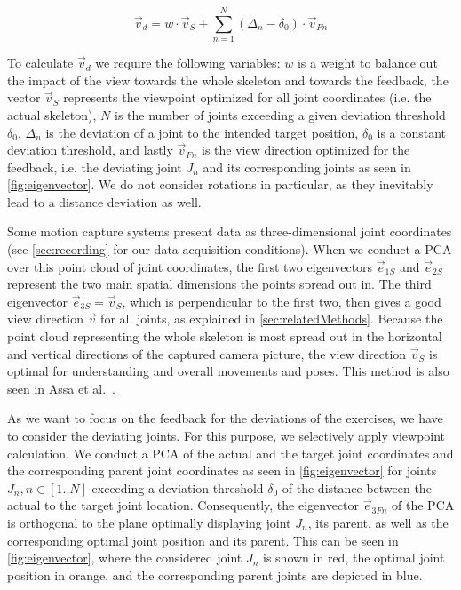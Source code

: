 \begin{equation}
	\label{eq:viewpoint}
	\vec{v}_d = w \cdot \vec{v}_{S} + \sum_{n=1}^N (\Delta_n - \delta_0) \cdot \vec{v}_{Fn}
\end{equation}

To calculate $\vec{v}_d$ we require the following variables: \(w\) is a weight to balance out the impact of the view towards the whole skeleton and towards the feedback, the vector \(\vec{v}_S\) represents the viewpoint optimized for all joint coordinates (i.e. the actual skeleton), \(N\) is the number of joints exceeding a given deviation threshold \(\delta_0\), \(\Delta_n\) is the deviation of a joint to the intended target position, \(\delta_0\) is a constant deviation threshold, and lastly \(\vec{v}_{Fn}\) is the view direction optimized for the feedback, i.e. the deviating joint \(J_n\) and its corresponding joints as seen in \autoref{fig:eigenvector}. We do not consider rotations in particular, as they inevitably lead to a distance deviation as well.

Some motion capture systems present data as three-dimensional joint coordinates (see \autoref{sec:recording} for our data acquisition conditions). When we conduct a PCA over this point cloud of joint coordinates, the first two eigenvectors \(\vec{e}_{1S}\) and \(\vec{e}_{2S}\) represent the two main spatial dimensions the points spread out in. The third eigenvector \(\vec{e}_{3S} = \vec{v}_S\), which is perpendicular to the first two, then gives a good view direction $\vec{v}$ for all joints, as explained in \autoref{sec:relatedMethods}. Because the point cloud representing the whole skeleton is most spread out in the horizontal and vertical directions of the captured camera picture, the view direction \(\vec{v}_S\) is optimal for understanding and overall movements and poses. This method is also seen in Assa et al.~\cite{assa2008moh}.

As we want to focus on the feedback for the deviations of the exercises, we have to consider the deviating joints. For this purpose, we selectively apply viewpoint calculation. We conduct a PCA of the actual and the target joint coordinates and the corresponding parent joint coordinates as seen in \autoref{fig:eigenvector} for joints $J_n, n\in[1..N]$ exceeding a deviation threshold \(\delta_0\) of the distance between the actual to the target joint location. Consequently, the eigenvector \(\vec{e}_{3Fn}\) of the PCA is orthogonal to the plane optimally displaying joint \(J_n\), its parent, as well as the corresponding optimal joint position and its parent. This can be seen in \autoref{fig:eigenvector}, where the considered joint \(J_n\) is shown in red, the optimal joint position in orange, and the corresponding parent joints are depicted in blue.

